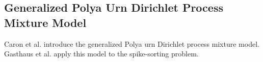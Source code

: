\documentclass{article}
\begin{document}
\subsection*{Generalized Polya Urn Dirichlet Process Mixture Model}
\vspace{6pt}
Caron et al. \cite{caron_2007} introduce the generalized Polya urn Dirichlet process mixture model. Gasthaus et al. \cite{gasthaus_2008} apply this model to the spike-sorting problem.



\begin{small}

 
\end{small}






\end{document}
